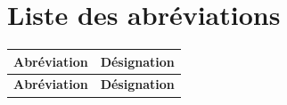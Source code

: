 \documentclass[12pt,a4paper]{report}
\newcommand{\headingfont}{}
\begin{document}
	\newpage
	\chapter*{{\headingfont Liste des abréviations}}
	
	\begin{center}
		\begin{longtable}{|l|p{11cm}|}
			\hline
			\textbf{Abréviation} & \textbf{Désignation} \\ \hline
			\endfirsthead
			
			\hline
			\textbf{Abréviation} & \textbf{Désignation} \\ \hline
			\endhead
			

\end{longtable}
\end{center}
\end{document}
